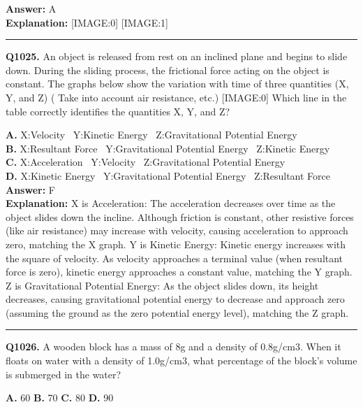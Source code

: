 \documentclass[12pt]{article}
\begin{document}
\textbf{Answer:} A \\
\textbf{Explanation:} [IMAGE:0]
[IMAGE:1]

\hrule
\vspace{1em}


\noindent
\textbf{Q1025.} An object is released from rest on an inclined plane and begins to slide down. During the sliding process, the frictional force acting on the object is constant. The graphs below show the variation with time of three quantities (X, Y, and Z)
(
Take into account air resistance, etc.)
[IMAGE:0]
Which line in the table correctly identifies the quantities X, Y, and Z?



\textbf{A.} X:Velocity  Y:Kinetic Energy  Z:Gravitational Potential Energy \\
\textbf{B.} X:Resultant Force  Y:Gravitational Potential Energy  Z:Kinetic Energy \\
\textbf{C.} X:Acceleration  Y:Velocity  Z:Gravitational Potential Energy \\
\textbf{D.} X:Kinetic Energy  Y:Gravitational Potential Energy  Z:Resultant Force \\

\textbf{Answer:} F \\
\textbf{Explanation:} X is Acceleration: The acceleration decreases over time as the object slides down the incline. Although friction is constant, other resistive forces (like air resistance) may increase with velocity, causing acceleration to approach zero, matching the X graph.
Y is Kinetic Energy: Kinetic energy increases with the square of velocity. As velocity approaches a terminal value (when resultant force is zero), kinetic energy approaches a constant value, matching the Y graph.
Z is Gravitational Potential Energy: As the object slides down, its height decreases, causing gravitational potential energy to decrease and approach zero (assuming the ground as the zero potential energy level), matching the Z graph.

\hrule
\vspace{1em}


\noindent
\textbf{Q1026.} A wooden block has a mass of 8g and a density of 0.8g/cm3. When it floats on water with a density of 1.0g/cm3, what percentage of the block's volume is submerged in the water?



\textbf{A.} 60%
\textbf{B.} 70%
\textbf{C.} 80%
\textbf{D.} 90%
\end{document}
